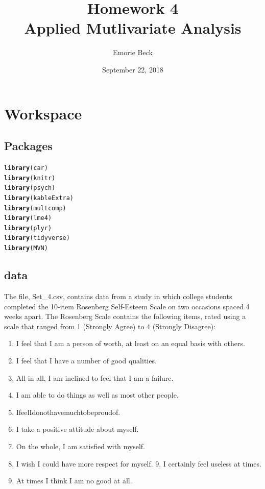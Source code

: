 \documentclass{article}\usepackage[]{graphicx}\usepackage[]{color}
\title{%
Homework 4\\
\large Applied Mutlivariate Analysis}
\date{September 22, 2018}
\author{Emorie Beck}
\makeatletter
\newcommand{\hlstd}[1]{\textcolor[rgb]{0.345,0.345,0.345}{#1}}%
\newcommand{\hlkwd}[1]{\textcolor[rgb]{0.737,0.353,0.396}{\textbf{#1}}}%
\newenvironment{kframe}{%
 \def\at@end@of@kframe{}%
 \ifinner\ifhmode%
  \def\at@end@of@kframe{\end{minipage}}%
  \begin{minipage}{\columnwidth}%
 \fi\fi%
 \def\FrameCommand##1{\hskip\@totalleftmargin \hskip-\fboxsep
 \colorbox{shadecolor}{##1}\hskip-\fboxsep
     \hskip-\linewidth \hskip-\@totalleftmargin \hskip\columnwidth}%
 \MakeFramed {\advance\hsize-\width
   \@totalleftmargin\z@ \linewidth\hsize
   \@setminipage}}%
 {\par\unskip\endMakeFramed%
 \at@end@of@kframe}
\newenvironment{knitrout}{}{} %
\makeatother
\begin{document}
\maketitle

\section{Workspace}
\subsection{Packages}



\begin{knitrout}
\color{fgcolor}\begin{kframe}
\begin{alltt}
\hlkwd{library}\hlstd{(car)}
\hlkwd{library}\hlstd{(knitr)}
\hlkwd{library}\hlstd{(psych)}
\hlkwd{library}\hlstd{(kableExtra)}
\hlkwd{library}\hlstd{(multcomp)}
\hlkwd{library}\hlstd{(lme4)}
\hlkwd{library}\hlstd{(plyr)}
\hlkwd{library}\hlstd{(tidyverse)}
\hlkwd{library}\hlstd{(MVN)}
\end{alltt}
\end{kframe}
\end{knitrout}

\subsection{data}
The file, Set\_4.csv, contains data from a study in which college students completed the 10-item Rosenberg Self-Esteem Scale on two occasions spaced 4 weeks apart. The Rosenberg Scale contains the following items, rated using a scale that ranged from 1 (Strongly Agree) to 4 (Strongly Disagree):
\begin{enumerate}
  \item I feel that I am a person of worth, at least on an equal basis with others. 
  \item I feel that I have a number of good qualities.
  \item All in all, I am inclined to feel that I am a failure.
  \item I am able to do things as well as most other people.
  \item IfeelIdonothavemuchtobeproudof.
  \item I take a positive attitude about myself.
  \item On the whole, I am satisfied with myself.
  \item I wish I could have more respect for myself. 9. I certainly feel useless at times.
  \item At times I think I am no good at all.
\end{enumerate}
\end{document}
